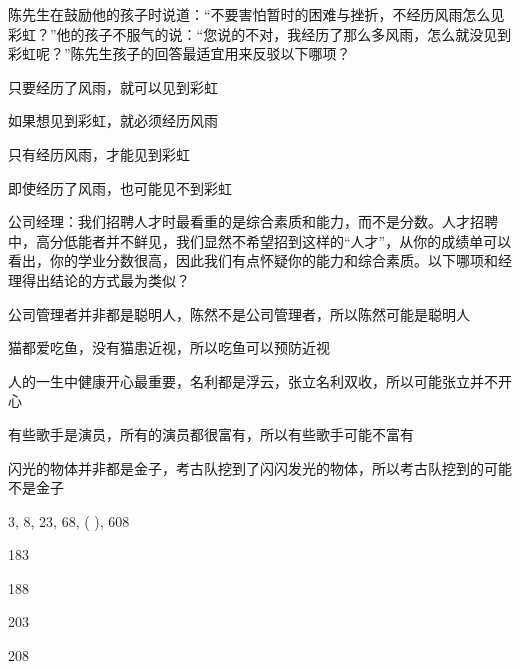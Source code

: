 \documentclass{exam-zh}
\begin{document}
\begin{question}
  陈先生在鼓励他的孩子时说道：“不要害怕暂时的困难与挫折，不经历风雨怎么见彩虹？”他的孩子不服气的说：“您说的不对，我经历了那么多风雨，怎么就没见到彩虹呢？”陈先生孩子的回答最适宜用来反驳以下哪项？ \paren

  \begin{choices}
    \item 只要经历了风雨，就可以见到彩虹
    \item 如果想见到彩虹，就必须经历风雨
    \item 只有经历风雨，才能见到彩虹
    \item 即使经历了风雨，也可能见不到彩虹
  \end{choices}
\end{question}

\begin{question}
  公司经理：我们招聘人才时最看重的是综合素质和能力，而不是分数。人才招聘中，高分低能者并不鲜见，我们显然不希望招到这样的“人才”，从你的成绩单可以看出，你的学业分数很高，因此我们有点怀疑你的能力和综合素质。以下哪项和经理得出结论的方式最为类似？ \paren

  \begin{choices}
    \item 公司管理者并非都是聪明人，陈然不是公司管理者，所以陈然可能是聪明人
    \item 猫都爱吃鱼，没有猫患近视，所以吃鱼可以预防近视
    \item 人的一生中健康开心最重要，名利都是浮云，张立名利双收，所以可能张立并不开心
    \item 有些歌手是演员，所有的演员都很富有，所以有些歌手可能不富有
    \item 闪光的物体并非都是金子，考古队挖到了闪闪发光的物体，所以考古队挖到的可能不是金子
  \end{choices}
\end{question}

\begin{question}
  3, 8, 23, 68, ( ), 608 \paren

  \begin{choices}
    \item 183
    \item 188
    \item 203
    \item 208
  \end{choices}
\end{question}
\end{document}
